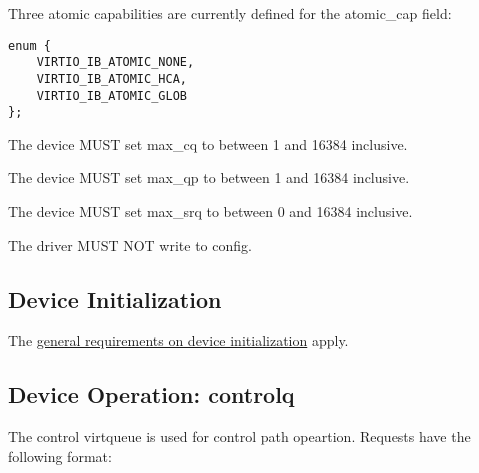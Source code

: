 Three atomic capabilities are currently defined for the atomic_cap field:

\begin{lstlisting}
enum {
    VIRTIO_IB_ATOMIC_NONE,
    VIRTIO_IB_ATOMIC_HCA,
    VIRTIO_IB_ATOMIC_GLOB
};
\end{lstlisting}


\begin{itemize*}
\item The device MUST set max_cq to between 1 and 16384 inclusive.
\item The device MUST set max_qp to between 1 and 16384 inclusive.
\item The device MUST set max_srq to between 0 and 16384 inclusive.
\end{itemize*}


\begin{itemize*}
\item The driver MUST NOT write to config.
\end{itemize*}

\subsection{Device Initialization}\label{sec:Device Types / RDMA Device / Device Initialization}

The
\hyperref[sec:General Initialization And Device Operation / Device Initialization]{general
requirements on device initialization} apply.

\subsection{Device Operation: controlq}\label{sec:Device Types / RDMA Device / controlq Operation}

The control virtqueue is used for control path opeartion. Requests have the following format:

